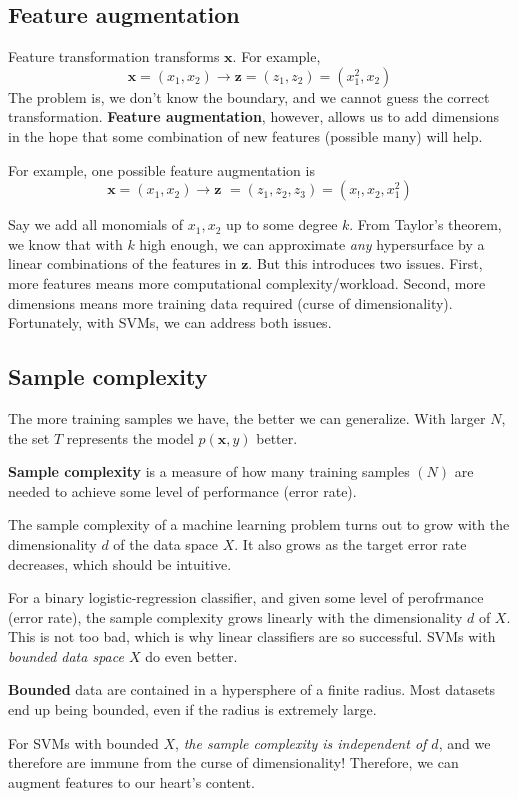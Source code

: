 \documentclass[titlepage, 12pt, leqno]{article}
\begin{document}
\subsection{Feature augmentation}
Feature transformation transforms $\textbf{x}$. For example,
\[
\textbf{x} = (x_{1}, x_{2}) \rightarrow \textbf{z} = (z_{1}, z_{2}) =
(x_{1}^{2}, x_{2})
\]
The problem is, we don't know the boundary, and we cannot guess the correct
transformation. \textbf{Feature augmentation}, however, allows us to add
dimensions in the hope that some combination of new features (possible many)
will help. 
\begin{ex}
    For example, one possible feature augmentation is
    \[
    \textbf{x} = (x_{1}, x_{2}) \rightarrow \textbf{z } = (z_{1},z_{2},z_{3})
    = (x_{!},x_{2},x_{1}^{2})
    \]
\end{ex}

Say we add all monomials of $x_{1},x_{2}$ up to some degree $k$. From Taylor's
theorem, we know that with $k$ high enough, we can approximate \textit{any}
hypersurface by a linear combinations of the features in $\textbf{z}$. But
this introduces two issues. First, more features means more computational
complexity/workload. Second, more dimensions means more training data 
required (curse of dimensionality). Fortunately, with SVMs, we can address
both issues.

\subsection{Sample complexity}
The more training samples we have, the better we can generalize. With larger
$N$, the set $T$ represents the model $p(\textbf{x},y)$ better. 
\begin{definition}
    \textbf{Sample complexity} is a measure of how many training samples $(N)$
    are needed to achieve some level of performance (error rate).
\end{definition}
The sample complexity of a machine learning problem turns out to grow with the
dimensionality $d$ of the data space $X$. It also grows as the target error rate
decreases, which should be intuitive.

For a binary logistic-regression classifier, and given some level of perofrmance
(error rate), the sample complexity grows linearly with the dimensionality $d$
of $X$. This is not too bad, which is why linear classifiers are so successful.
SVMs with \textit{bounded data space $X$} do even better.
\begin{definition}
    \textbf{Bounded} data are contained in a hypersphere of a finite radius.
    Most datasets end up being bounded, even if the radius is extremely large.
\end{definition}
For SVMs with bounded $X$, \textit{the sample complexity is independent of
$d$}, and we therefore are immune from the curse of dimensionality! Therefore,
we can augment features to our heart's content.
\end{document}
